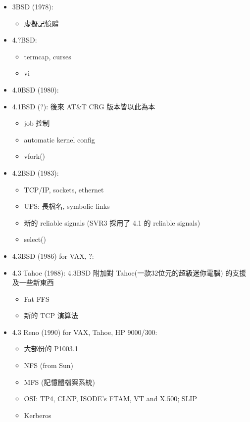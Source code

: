 \documentclass{article}
\begin{document}
\begin{CJK*}{Bg5}{ming}
{\begin{itemize}
         \item 3BSD (1978):
	   \begin{itemize}
           \item 虛擬記憶體
	   \end{itemize}

         \item 4.?BSD:
	   \begin{itemize}
           \item termcap, curses
           \item vi
	   \end{itemize}

         \item 4.0BSD (1980):

         \item 4.1BSD (?): 後來 AT\&T CRG 版本皆以此為本
	   \begin{itemize}
           \item job 控制
           \item automatic kernel config
           \item vfork()
	   \end{itemize}

         \item 4.2BSD (1983):
	   \begin{itemize}
           \item TCP/IP, sockets, ethernet
           \item UFS: 長檔名, symbolic links
           \item 新的 reliable signals (SVR3 採用了 4.1 的 reliable signals)
           \item select()
	   \end{itemize}

         \item 4.3BSD (1986) for VAX, ?:
         \item 4.3 Tahoe (1988): 4.3BSD 附加對 Tahoe(一款32位元的超級迷你電腦)
           的支援及一些新東西
	   \begin{itemize}
           \item Fat FFS
           \item 新的 TCP 演算法
	   \end{itemize}
         \item 4.3 Reno (1990) for VAX, Tahoe, HP 9000/300:
	   \begin{itemize}
           \item 大部份的 P1003.1
           \item NFS (from Sun)
           \item MFS (記憶體檔案系統)
           \item OSI: TP4, CLNP, ISODE's FTAM, VT and X.500;  SLIP
           \item Kerberos
	   \end{itemize}


\end{itemize}}
\end{CJK*}
\end{document}
